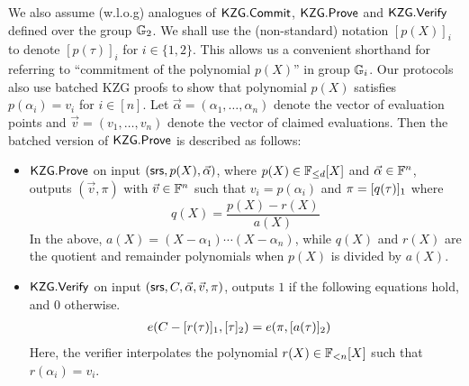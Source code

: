 We also assume (w.l.o.g) analogues of $\mathsf{KZG.Commit}$, $\mathsf{KZG.Prove}$ and $\mathsf{KZG.Verify}$ defined over the group $\mathbb{G}_2$.
We shall use the (non-standard) notation $[p(X)]_i$ to denote $[p(\tau)]_i$ for $i\in \{1,2\}$.
This allows us a convenient shorthand for referring to ``commitment of the polynomial $p(X)$'' in group $\mathbb{G}_i$.
Our protocols also use batched KZG proofs to show that polynomial $p(X)$ satisfies $p(\alpha_i)=v_i$ for $i\in [n]$. Let
$\vec{\alpha}=(\alpha_1,\ldots,\alpha_n)$
denote the vector of evaluation points and $\vec{v}=(v_1,\ldots,v_n)$ denote the vector of claimed evaluations. Then the batched
version of $\mathsf{KZG.Prove}$ is described as follows:
\begin{itemize}[leftmargin=1em]
	\item $\mathsf{KZG.Prove}$ on input $(\mathsf{srs},p(X),\vec{\alpha})$, where $p(X) \in \mathbb{F}_{\leq d}[X]$ and $\vec{\alpha}\in\mathbb{F}^n$,
	outputs $(\vec{v}, \pi)$ with $\vec{v}\in \mathbb{F}^n$ such that $v_i=p(\alpha_i)$ and $\pi=[q(\tau)]_1$ where
	\[ q(X)=\frac{p(X)-r(X)}{a(X)} \]
	In the above, $a(X)=(X-\alpha_1)\cdots(X-\alpha_n)$, while $q(X)$ and $r(X)$ are the quotient and remainder polynomials when
	 $p(X)$ is divided by $a(X)$.
	\item $\mathsf{KZG.Verify}$ on input $(\mathsf{srs},C,\vec{\alpha},\vec{v},\pi)$, outputs $1$ if the following equations hold, and $0$ otherwise.
	\begin{align*}
		e(C-[r(\tau)]_1, [\tau]_2) &= e(\pi, [a(\tau)]_2)
	\end{align*}
	Here, the verifier interpolates the polynomial $r(X)\in \mathbb{F}_{<n}[X]$ such that $r(\alpha_i)=v_i$.
\end{itemize}

